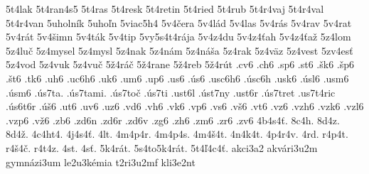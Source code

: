{5t4lak
5t4ran4s5
5t4ras
5t4resk
5t4retin
5t4ried
5t4rub
5t4r4vaj
5t4r4val
5t4r4van
5uholník
5uhoľn
5viac5h4
5v4čera
5v4lád
5v4las
5v4rás
5v4rav
5v4rat
5v4rát
5v4šimn
5v4ták
5v4tip
5vy5s4t4rája
5v4z4du
5v4z4ťah
5v4z4ťaž
5z4lom
5z4luč
5z4mysel
5z4mysl
5z4nak
5z4nám
5z4náša
5z4rak
5z4väz
5z4vest
5zv4esť
5z4vod
5z4vuk
5z4vuč
5ž4ráč
5ž4rane
5ž4reb
5ž4rút
.cv6
.ch6
.sp6
.st6
.šk6
.šp6
.št6
.tk6
.uh6
.uc6h6
.uk6
.um6
.up6
.us6
.ús6
.usc6h6
.úsc6h
.usk6
.úsl6
.usm6
.úsm6
.ús7ta.
.ús7tami.
.ús7toč
.ús7ti
.ust6l
.úst7ny
.ust6r
.ús7tret
.us7t4ric
.ús6t6r
.úš6
.ut6
.uv6
.uz6
.vd6
.vh6
.vk6
.vp6
.vs6
.vš6
.vt6
.vz6
.vzh6
.vzk6
.vzl6
.vzp6
.vž6
.zb6
.zd6n
.zd6r
.zd6v
.zg6
.zh6
.zm6
.zr6
.zv6
4b4s4ť.
8c4h.
8d4z.
8d4ž.
4c4ht4.
4j4s4ť.
4lt.
4m4p4r.
4m4p4s.
4m4š4t.
4n4k4t.
4p4r4v.
4rd.
r4p4t.
r4š4č.
r4t4z.
4st.
4sť.
5k4rát.
5s4to5k4rát.
5t4ľ4c4ť.
akci3a2
akvári3u2m
gymnázi3um
le2u3kémia
t2ri3u2mf
kli3e2nt
}
%
%
